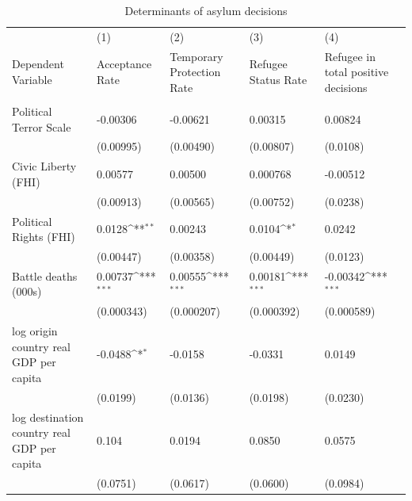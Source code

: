 \documentclass[a4paper,12pt]{article}
\newcommand{\sym}[1]{\rlap{#1}}
\begin{document}
\begin{table}[htbp]\centering
	\footnotesize
\def\sym#1{\ifmmode^{#1}\else\(^{#1}\)\fi}
\caption{Determinants of asylum decisions}

\begin{tabularx}{\textwidth}{l*{4}{Y}}
\hline\hline
\centering                                        &(1) & (2) & (3) & (4)\\
\centering Dependent Variable &Acceptance  Rate&Temporary Protection Rate & Refugee Status Rate & Refugee in total positive decisions\\
\hline
&\\
Political Terror Scale                  &  -0.00306         &  -0.00621         &   0.00315         &   0.00824         \\
                                        & (0.00995)         & (0.00490)         & (0.00807)         &  (0.0108)         \\
[0.3em]
Civic Liberty (FHI)                     &   0.00577         &   0.00500         &  0.000768         &  -0.00512         \\
                                        & (0.00913)         & (0.00565)         & (0.00752)         &  (0.0238)         \\
[0.3em]
Political Rights (FHI)                  &    0.0128\sym{**} &   0.00243         &    0.0104\sym{*}  &    0.0242         \\
                                        & (0.00447)         & (0.00358)         & (0.00449)         &  (0.0123)         \\
[0.3em]
Battle deaths (000s)                     &   0.00737\sym{***}&   0.00555\sym{***}&   0.00181\sym{***}&  -0.00342\sym{***}\\
                                        &(0.000343)         &(0.000207)         &(0.000392)         &(0.000589)         \\
[0.3em]
log origin country real GDP per capita  &   -0.0488\sym{*}  &   -0.0158         &   -0.0331         &    0.0149         \\
                                        &  (0.0199)         &  (0.0136)         &  (0.0198)         &  (0.0230)         \\
[0.3em]
log destination country real GDP per capita&     0.104         &    0.0194         &    0.0850         &    0.0575         \\
                                        &  (0.0751)         &  (0.0617)         &  (0.0600)         &  (0.0984)         \\

\end{tabularx}
\end{table}
\end{document}

